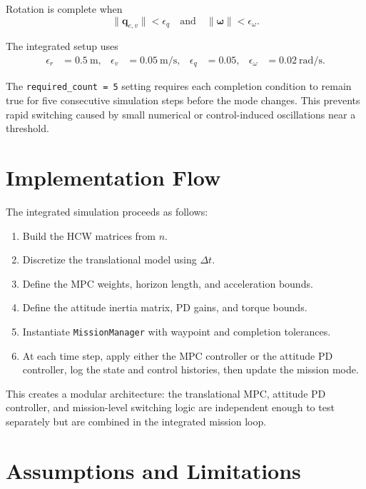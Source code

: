 \documentclass[11pt]{article}
\begin{document}
Rotation is complete when
\begin{equation}
    \|\bm{q}_{e,v}\| < \epsilon_q
    \quad\text{and}\quad
    \|\bm{\omega}\| < \epsilon_{\omega}.
\end{equation}

The integrated setup uses
\begin{align}
\epsilon_r &= 0.5~\mathrm{m},&
\epsilon_v &= 0.05~\mathrm{m/s},&
\epsilon_q &= 0.05,&
\epsilon_{\omega} &= 0.02~\mathrm{rad/s}.
\end{align}

The \texttt{required\_count = 5} setting requires each completion condition to remain true for five consecutive simulation steps before the mode changes. This prevents rapid switching caused by small numerical or control-induced oscillations near a threshold.

\section{Implementation Flow}

The integrated simulation proceeds as follows:
\begin{enumerate}[leftmargin=1.5em]
    \item Build the HCW matrices from \(n\).
    \item Discretize the translational model using \(\Delta t\).
    \item Define the MPC weights, horizon length, and acceleration bounds.
    \item Define the attitude inertia matrix, PD gains, and torque bounds.
    \item Instantiate \texttt{MissionManager} with waypoint and completion tolerances.
    \item At each time step, apply either the MPC controller or the attitude PD controller, log the state and control histories, then update the mission mode.
\end{enumerate}

This creates a modular architecture: the translational MPC, attitude PD controller, and mission-level switching logic are independent enough to test separately but are combined in the integrated mission loop.

\section{Assumptions and Limitations}
\end{document}

